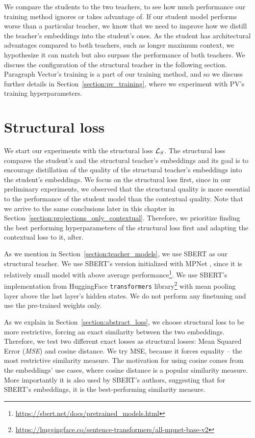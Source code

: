 We compare the students to the two teachers, to see how much performance our
training method ignores or takes advantage of. If our student model performs
worse than a particular teacher, we know that we need to improve how we distill
the teacher's embeddings into the student's ones. As the student has
architectural advantages compared to both teachers, such as longer maximum
context, we hypothesize it can match but also surpass the performance of both
teachers. We discuss the configuration of the structural teacher in the
following section. Paragraph Vector's training is a part of our training
method, and so we discuss further details in Section~\ref{section:pv_training},
where we experiment with PV's training hyperparameters.

\section{Structural loss}\label{section:structural_loss}

We start our experiments with the structural loss $\mathcal{L}_S$. The structural
loss compares the student's and the structural teacher's embeddings and its
goal is to encourage distillation of the quality of the structural teacher's
embeddings into the student's embeddings. We focus on the structural loss first,
since in our preliminary experiments, we observed that the structural quality
is more essential to the performance of the student model than the contextual
quality. Note that we arrive to the same conclusions later in this chapter in
Section~\ref{section:projections_only_contextual}. Therefore, we prioritize
finding the best performing hyperparameters of the structural loss first and
adapting the contextual loss to it, after.

As we mention in Section~\ref{section:teacher_models}, we use SBERT
\citep{reimers2019sentence} as our structural teacher. We use SBERT's version
initialized with MPNet \citep{song2020mpnet}, since it is relatively small
model with above average
performance\footnote{\url{https://sbert.net/docs/pretrained_models.html}}. We
use SBERT's implementation from HuggingFace \texttt{transformers}
library\footnote{\url{https://huggingface.co/sentence-transformers/all-mpnet-base-v2}}
with mean pooling layer above the last layer's hidden states. We do not perform
any finetuning and use the pre-trained weights only.

As we explain in Section~\ref{section:abstract_loss}, we choose structural loss
to be more restrictive, forcing an exact similarity between the two embeddings.
Therefore, we test two different exact losses as structural losses: Mean Squared
Error (\emph{MSE}) and cosine distance. We try MSE, because it forces
equality -- the most restrictive similarity measure. The motivation for using
cosine comes from the embeddings' use cases, where cosine distance is a popular
similarity measure. More importantly it is also used by SBERT's authors,
suggesting that for SBERT's embeddings, it is the best-performing similarity
measure.


